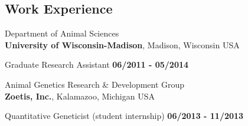 \documentclass[margin,line,10pt]{res}
\newenvironment{list2}{
  \begin{list}{$\bullet$}{%
      \setlength{\itemsep}{0in}
      \setlength{\parsep}{0in} \setlength{\parskip}{0in}
      \setlength{\topsep}{0in} \setlength{\partopsep}{0in} 
      \setlength{\leftmargin}{0.2in}}}{\end{list}}
\begin{document}
\begin{resume}
\vspace{0.4cm}
\section{\sc Work \phantom{1cm} Experience}
Department of Animal Sciences\\
{\bf University of Wisconsin-Madison}, Madison, Wisconsin USA
\vspace{-.35cm}

Graduate Research Assistant   \hfill {\bf 06/2011 - 05/2014}\\
\vspace{-.4cm}

Animal Genetics Research \& Development  Group \\
{\bf Zoetis, Inc.}, Kalamazoo, Michigan USA

\vspace{-.35cm}

Quantitative Geneticist (student internship)   \hfill {\bf 06/2013 - 11/2013}\\





\begin{comment}
\vspace{0.5cm}
\section{\sc Awards and Recognition}
\begin{list2}
  \item 
\end{list2}
\end{comment}



\vspace{0.5cm}

\end{resume}
\end{document}
